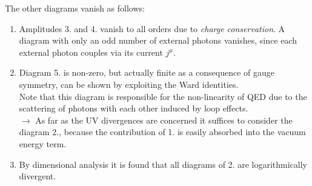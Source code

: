 The other diagrams vanish as follows:
\begin{enumerate}
	\item Amplitudes 3. and 4. vanish to all orders due to \emph{charge conservation}. A diagram with only an odd number of external photons vanishes, since each external photon couples via its current $j^{\mu}$.
	\item Diagram 5. is non-zero, but actually finite as a consequence of gauge symmetry, can be shown by exploiting the Ward identities.\\
	Note that this diagram is responsible for the non-linearity of QED due to the scattering of photons with each other induced by loop effects.\\
	$\rightarrow$ As far as the UV divergences are concerned it suffices to consider the diagram 2., because the contribution of 1. is easily absorbed into the vacuum energy term.
	\item By dimensional analysis it is found that all diagrams of 2. are logarithmically divergent.
\end{enumerate}

